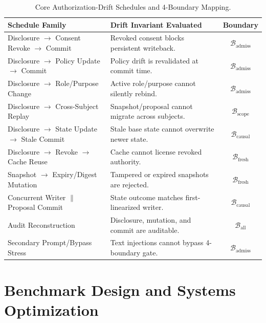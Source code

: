 \documentclass[conference,a4paper]{IEEEtran}
\begin{document}
\begin{table}[t]
\caption{Core Authorization-Drift Schedules and 4-Boundary Mapping.}
\label{tab:attacks}
\centering\scriptsize
\begin{tabularx}{\columnwidth}{p{}X c}
\toprule
\textbf{Schedule Family} & \textbf{Drift Invariant Evaluated} & \textbf{Boundary}\\
\midrule
Disclosure $\rightarrow$ Consent Revoke $\rightarrow$ Commit & Revoked consent blocks persistent writeback. & $\mathcal{B}_{\text{admiss}}$\\
Disclosure $\rightarrow$ Policy Update $\rightarrow$ Commit & Policy drift is revalidated at commit time. & $\mathcal{B}_{\text{admiss}}$\\
Disclosure $\rightarrow$ Role/Purpose Change & Active role/purpose cannot silently rebind. & $\mathcal{B}_{\text{admiss}}$\\
Disclosure $\rightarrow$ Cross-Subject Replay & Snapshot/proposal cannot migrate across subjects. & $\mathcal{B}_{\text{scope}}$\\
Disclosure $\rightarrow$ State Update $\rightarrow$ Stale Commit & Stale base state cannot overwrite newer state. & $\mathcal{B}_{\text{causal}}$\\
Disclosure $\rightarrow$ Revoke $\rightarrow$ Cache Reuse & Cache cannot license revoked authority. & $\mathcal{B}_{\text{fresh}}$\\
Snapshot $\rightarrow$ Expiry/Digest Mutation & Tampered or expired snapshots are rejected. & $\mathcal{B}_{\text{fresh}}$\\
Concurrent Writer $\parallel$ Proposal Commit & State outcome matches first-linearized writer. & $\mathcal{B}_{\text{causal}}$\\
Audit Reconstruction & Disclosure, mutation, and commit are auditable. & $\mathcal{B}_{\text{all}}$\\
\midrule
Secondary Prompt/Bypass Stress & Text injections cannot bypass 4-boundary gate. & $\mathcal{B}_{\text{admiss}}$\\
\bottomrule
\end{tabularx}
\end{table}

\section{Benchmark Design and Systems Optimization}
\end{document}
